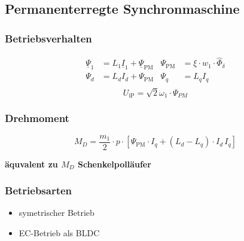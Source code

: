 \begin{sectionbox}
\subsection{Permanenterregte Synchronmaschine}
\subsubsection{Betriebsverhalten}
\begin{align*}
\underline{\Psi}_1 &= L_1\underline{I}_1 + \underline{\Psi}_\text{PM} & \Psi_\text{PM} &= \xi\cdot w_1 \cdot\hat{\Phi}_\delta\\
\Psi_d &= L_d I_d + \Psi_\text{PM} & \Psi_q &= L_q I_q\\
\end{align*}
\[U_\text{iP} = \sqrt{2}\omega_1\cdot\Psi_{PM}\]
\subsubsection{Drehmoment}
\begin{emphbox}
\[M_D = \frac{m_1}{2}\cdot p\cdot\left[\Psi_\text{PM}\cdot I_q + (L_d - L_q)\cdot I_d\,I_q\right]\]
\end{emphbox}
\textbf{äquvalent zu $M_D$ Schenkelpolläufer}

\subsubsection{Betriebsarten}
\begin{itemize}
\item symetrischer Betrieb
\item EC-Betrieb als BLDC
\end{itemize}
\end{sectionbox}
